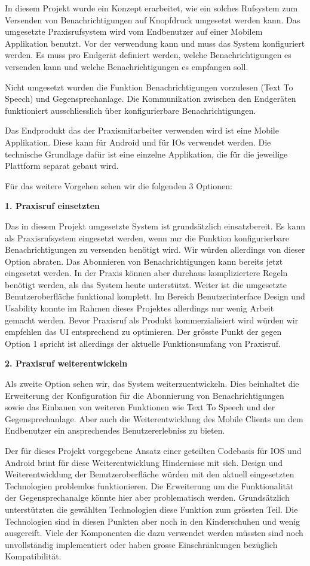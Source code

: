 In diesem Projekt wurde ein Konzept erarbeitet, wie ein solches Rufsystem zum Versenden von Benachrichtigungen auf Knopfdruck umgesetzt werden kann.
Das umgesetzte Praxisrufsystem wird vom Endbenutzer auf einer Mobilem Applikation benutzt.
Vor der verwendung kann und muss das System konfiguriert werden.
Es muss pro Endgerät definiert werden, welche Benachrichtigungen es versenden kann und welche Benachrichtigungen es empfangen soll.

Nicht umgesetzt wurden die Funktion Benachrichtigungen vorzulesen (Text To Speech) und Gegensprechanlage.
Die Kommunikation zwischen den Endgeräten funktioniert ausschliesslich über konfigurierbare Benachrichtigungen.

Das Endprodukt das der Praxismitarbeiter verwenden wird ist eine Mobile Applikation.
Diese kann für Android und für IOs verwendet werden.
Die technische Grundlage dafür ist eine einzelne Applikation, die für die jeweilige Plattform separat gebaut wird.

Für das weitere Vorgehen sehen wir die folgenden 3 Optionen:


\textbf{1. Praxisruf einsetzten}

Das in diesem Projekt umgesetzte System ist grundsätzlich einsatzbereit.
Es kann als Praxisrufsystem eingesetzt werden, wenn nur die Funktion konfigurierbare Benachrichtigungen zu versenden benötigt wird.
Wir würden allerdings von dieser Option abraten.
Das Abonnieren von Benachrichtigungen kann bereits jetzt eingesetzt werden.
In der Praxis können aber durchaus kompliziertere Regeln benötigt werden, als das System heute unterstützt.
Weiter ist die umgesetzte Benutzeroberfläche funktional komplett.
Im Bereich Benutzerinterface Design und Usability konnte im Rahmen dieses Projektes allerdings nur wenig Arbeit gemacht werden.
Bevor Praxisruf als Produkt kommerzialisiert wird würden wir empfehlen das UI entsprechend zu optimieren.
Der grösste Punkt der gegen Option 1 spricht ist allerdings der aktuelle Funktionsumfang von Praxisruf.

\textbf{2. Praxisruf weiterentwickeln}

Als zweite Option sehen wir, das System weiterzuentwickeln.
Dies beinhaltet die Erweiterung der Konfiguration für die Abonnierung von Benachrichtigungen
sowie das Einbauen von weiteren Funktionen wie Text To Speech und der Gegensprechanlage.
Aber auch die Weiterentwicklung des Mobile Clients um dem Endbenutzer ein ansprechendes Benutzererlebniss zu bieten.

Der für dieses Projekt vorgegebene Ansatz einer geteilten Codebasis für IOS und Android brint für diese Weiterentwicklung Hindernisse mit sich.
Design und Weiterentwicklung der Benutzeroberfläche würden mit den aktuell eingesetzten Technologien problemlos funktionieren.
Die Erweiterung um die Funktionalität der Gegensprechanalge könnte hier aber problematisch werden.
Grundsätzlich unterstützten die gewählten Technologien diese Funktion zum grössten Teil.
Die Technologien sind in diesen Punkten aber noch in den Kinderschuhen und wenig ausgereift.
Viele der Komponenten die dazu verwendet werden müssten sind noch unvollständig implementiert oder haben grosse Einschränkungen bezüglich Kompatibilität.

